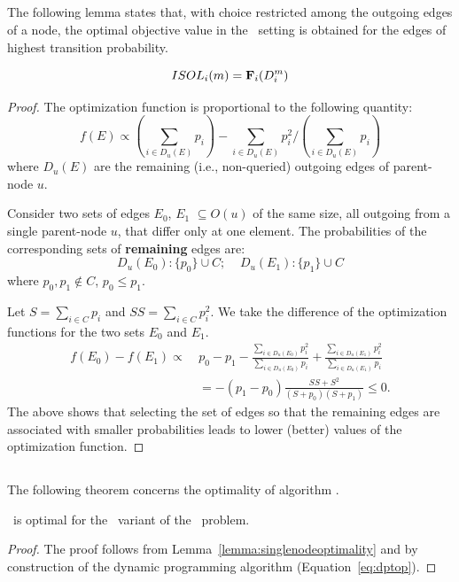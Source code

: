 \subsection{}

The following lemma states that, with choice restricted 
among the outgoing edges of a node, the optimal
objective value in the \edgetransitions\ setting is obtained for
the edges of highest transition probability.
\begin{lemma}
\begin{equation}
ISOL_i(m) =  \mathbf{F}_i(D_i^m)	
\end{equation}
\begin{proof}
The optimization function is proportional to the following quantity:
\begin{equation}
f(E) \propto (\sum_{i\in D_u(E)} p_i) - {\sum_{i\in D_u(E)} p_i^2} / {(\sum_{i\in D_u(E)} p_i)}
\end{equation}
where $D_u(E)$ are the remaining (i.e., non-queried) outgoing edges of
parent-node $u$.

Consider two sets of edges $E_0$, $E_1$ $\subseteq O(u)$ of the same size,
all outgoing from a
single parent-node $u$, that differ only at one element.
The probabilities of the corresponding sets of {\bf remaining} edges
are:
\begin{equation}
 D_u(E_0): \{p_0\} \cup C;\;\;\;\;D_u(E_1): \{p_1\} \cup C
\end{equation}
where $p_0, p_1\not\in C$, $p_0 \leq p_1$.

Let $S = \sum_{i\in C} p_i$ and $SS = \sum_{i\in C} p_i^2$.
We take the difference of the optimization functions for the two sets $E_0$
and $E_1$.
\begin{align*}
	f(E_0) - f(E_1) \propto\ & p_0 - p_1 -  \frac{\sum_{i\in D_u(E_0)}{p_i^2}}{\sum_{i\in D_u(E_0)}{p_i}}  
		+  \frac{\sum_{i\in D_u(E_1)}{p_i^2}}{\sum_{i\in D_u(E_1)} {p_i}} \\
	& = - (p_1 - p_0)\frac{SS + S^2}{(S + p_0)(S + p_1)} \leq 0.
\end{align*}
The above shows that selecting the set of edges so that the remaining edges
are associated with smaller probabilities leads to lower (better) values of the
optimization function.
\end{proof}
\label{lemma:singlenodeoptimality}
\end{lemma}

\subsection{}
The following theorem concerns the optimality of algorithm \edgeDP.
\begin{theorem}
\edgeDP\ is optimal for the \edgetransitions\ variant of 
the \mcproblem\ problem.
\label{theorem:edgeDP}
\end{theorem}
\begin{proof}
The proof follows from Lemma~\ref{lemma:singlenodeoptimality}
and by construction of the dynamic programming algorithm
(Equation~\eqref{eq:dptop}).
\end{proof}

